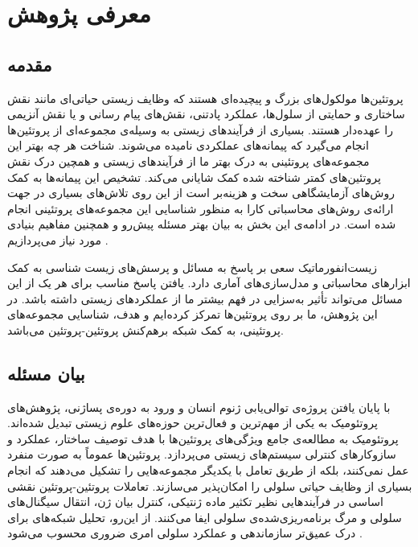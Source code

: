 \chapter{معرفی پژوهش}
\section{مقدمه}

پروتئین‌ها مولکول‌های بزرگ و پیچیده‌ای هستند که وظایف زیستی حیاتی‌ای مانند نقش ساختاری و حمایتی از سلول‌ها، عملکرد پادتنی، نقش‌های پیام رسانی و یا نقش آنزیمی را عهده‌دار هستند. 
بسیاری از فرآیند‌های زیستی به وسیله‌ی مجموعه‌ای از پروتئین‌ها انجام می‌گیرد که پیمانه‌های عملکردی نامیده می‌شوند. شناخت هر چه بهتر این مجموعه‌های پروتئینی به درک بهتر ما از فرآيند‌های زیستی و همچین درک نقش پروتئین‌های کمتر شناخته شده کمک شایانی می‌کند. تشخیص این پیمانه‌ها به کمک روش‌های آزمایشگاهی سخت و هزینه‌بر است از این روی تلاش‌های بسیاری در جهت ارائه‌ی روش‌های محاسباتی کارا به منظور شناسایی این مجموعه‌های پروتئینی انجام شده است.
در ادامه‌ی این بخش به بیان بهتر مسئله پیش‌رو و همچنین مفاهیم بنیادی مورد نیاز می‌پردازیم \cite{adappi}.

زیست‌انفورماتیک سعی بر پاسخ به مسائل و پرسش‌های زیست شناسی به کمک ابزار‌های محاسباتی و مدل‌سازی‌های آماری دارد. یافتن پاسخ مناسب برای هر یک از این مسائل می‌تواند تأثیر به‌سزایی در فهم بیشتر ما از عملکرد‌های زیستی داشته باشد. در این پژوهش، ما بر روی پروتئين‌‌ها تمرکز کرده‌ایم و هدف، شناسایی مجموعه‌های پروتئینی، به کمک شبکه‌ برهم‌کنش پروتئین-پروتئین می‌باشد.



\section{بیان مسئله}
با پایان یافتن پروژه‌ی توالی‌یابی ژنوم انسان و ورود به دوره‌ی پسا‌ژنی، پژوهش‌های پروتئومیک به یکی از مهم‌ترین و فعال‌ترین حوزه‌های علوم زیستی تبدیل شده‌اند. پروتئومیک به مطالعه‌ی جامع ویژگی‌های پروتئین‌ها با هدف توصیف ساختار، عملکرد و سازوکارهای کنترلی سیستم‌های زیستی می‌پردازد. پروتئین‌ها عموماً به صورت منفرد عمل نمی‌کنند، بلکه از طریق تعامل با یکدیگر مجموعه‌هایی را تشکیل می‌دهند که انجام بسیاری از وظایف حیاتی سلولی را امکان‌پذیر می‌سازند. تعاملات پروتئین-پروتئین نقشی اساسی در فرآیندهایی نظیر تکثیر ماده ژنتیکی، کنترل بیان ژن، انتقال سیگنال‌های سلولی و مرگ برنامه‌ریزی‌شده‌ی سلولی ایفا می‌کنند. از این‌رو، تحلیل شبکه‌های  برای درک عمیق‌تر سازماندهی و عملکرد سلولی امری ضروری محسوب می‌شود \cite{survey}.


